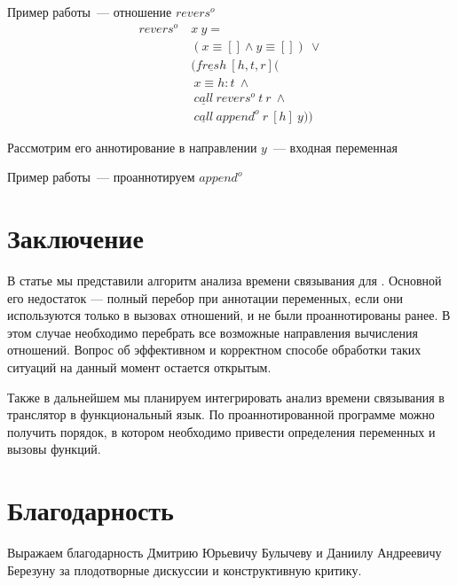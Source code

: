 \documentclass[conference,american,russian]{IEEEtran}
\begin{document}
Пример работы~--- отношение $revers^o$
\begin{align*}
revers^o \ &x \ y = \\
           &(x \equiv [] \wedge y \equiv []) \ \vee \\
           &(\underline{fresh} \ [h, t, r] ( \\
           & \ x \equiv h : t \ \wedge \\
           & \ \underline{call} \ revers^o \ t \ r \ \wedge \\ 
           & \ \underline{call} \ append^o \ r \ [h] \ y ))
\end{align*}

Рассмотрим его аннотирование в направлении $y$~--- входная переменная

Пример работы~--- проаннотируем $append^o$

\section{Заключение}\label{conclusion}

В статье мы представили алгоритм анализа времени связывания для \miniKanren{}. Основной его недостаток --- полный перебор при аннотации переменных, если они используются только в вызовах отношений, и не были проаннотированы ранее. В этом случае необходимо перебрать все возможные направления вычисления отношений. Вопрос об эффективном и корректном способе обработки таких ситуаций на данный момент остается открытым.

Также в дальнейшем мы планируем интегрировать анализ времени связывания в транслятор в функциональный язык. По проаннотированной программе можно получить порядок, в котором необходимо привести определения переменных и вызовы функций.

\section*{Благодарность}

Выражаем благодарность Дмитрию Юрьевичу Булычеву и Даниилу Андреевичу Березуну за плодотворные дискуссии и конструктивную критику.



\end{document}
